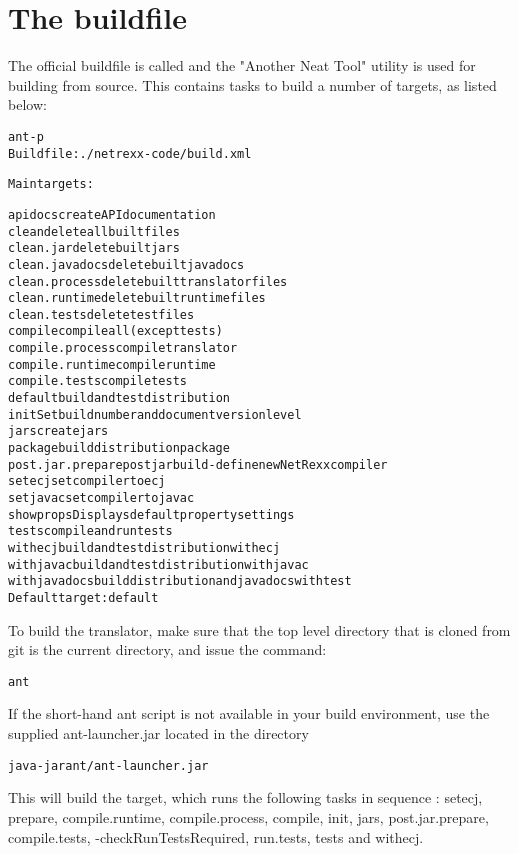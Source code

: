 \section{The buildfile}
The official buildfile is called  and the "Another Neat Tool"
 utility is used for building \nr{} from source. This
 contains tasks to build a number of targets, as listed below:
\begin{alltt}
ant -p
    Buildfile: ./netrexx-code/build.xml

    Main targets:

    apidocs           create API documentation
    clean             delete all built files
    clean.jar         delete built jars
    clean.javadocs    delete built javadocs
    clean.process     delete built translator files
    clean.runtime     delete built runtime files
    clean.tests       delete test files
    compile           compile all (except tests)
    compile.process   compile translator
    compile.runtime   compile runtime
    compile.tests     compile tests
    default           build and test distribution
    init              Set build number and document version level
    jars              create jars
    package           build distribution package
    post.jar.prepare  post jar build - define new NetRexx compiler
    setecj            set compiler to ecj
    setjavac          set compiler to javac
    showprops         Displays default property settings
    tests             compile and run tests
    withecj           build and test distribution with ecj
    withjavac         build and test distribution with javac
    withjavadocs      build distribution and javadocs with test
    Default target: default
\end{alltt}
To build the translator, make sure that the top level directory that is cloned from git is the
current directory, and issue the command:
\begin{alltt}
    ant
\end{alltt}
If the short-hand ant script is not available in your build environment, use the \nr{} supplied
ant-launcher.jar located in the   directory
\begin{alltt}
    java -jar ant/ant-launcher.jar
\end{alltt}

This will build the  target, which runs the following tasks in sequence :
setecj, prepare, compile.runtime, compile.process, compile, init, jars, post.jar.prepare,
compile.tests, -checkRunTestsRequired, run.tests, tests and withecj.

